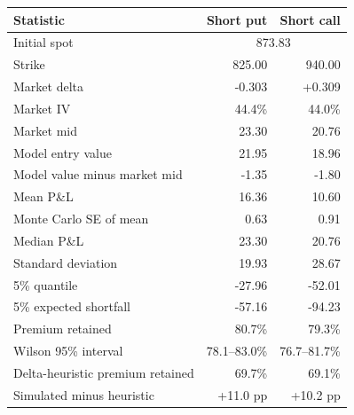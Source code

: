 \begin{tabular}{lrr}\toprule
Statistic & Short put & Short call \\\midrule
Initial spot & \multicolumn{2}{c}{873.83} \\
Strike & 825.00 & 940.00 \\
Market delta & -0.303 & +0.309 \\
Market IV & 44.4\% & 44.0\% \\
Market mid & 23.30 & 20.76 \\
Model entry value & 21.95 & 18.96 \\
Model value minus market mid & -1.35 & -1.80 \\
Mean P\&L & 16.36 & 10.60 \\
Monte Carlo SE of mean & 0.63 & 0.91 \\
Median P\&L & 23.30 & 20.76 \\
Standard deviation & 19.93 & 28.67 \\
5\% quantile & -27.96 & -52.01 \\
5\% expected shortfall & -57.16 & -94.23 \\
Premium retained & 80.7\% & 79.3\% \\
Wilson 95\% interval & 78.1--83.0\% & 76.7--81.7\% \\
Delta-heuristic premium retained & 69.7\% & 69.1\% \\
Simulated minus heuristic & +11.0 pp & +10.2 pp \\
\bottomrule\end{tabular}
